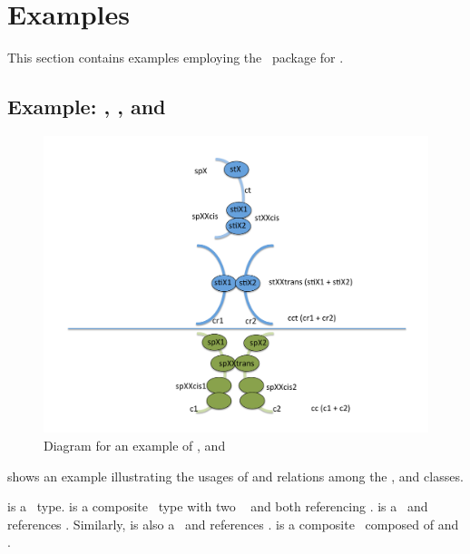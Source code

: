 
\section{Examples}
\label{def:Examples}

This section contains examples employing the \multi\ package for \SbmlLevelThree.

\subsection{Example: \ExCompartment, \SpeciesType, and \ExSpecies}
\label{def:Example:CompartmentSpeciesTypeSpecies}

\begin{figure}[htb]
  \includegraphics[scale=0.5]{./figs/example_ppt}
  \caption{Diagram for an example of \ExCompartment, \SpeciesType and 
    \ExSpecies}
  \label{fig:Example:CompartmentSpeciesTypeSpecies}
\end{figure}

 shows an example illustrating the usages of and relations among the \ExCompartment, \SpeciesType and \ExSpecies classes. 

 is a \compartment\ type.  is a composite \compartment\ type with two \compartmentReferences\  and  both referencing .  is a \notatypecompartment\ and references . Similarly,  is also a \notatypecompartment\ and references .  is a composite \notatypecompartment\ composed of  and .

